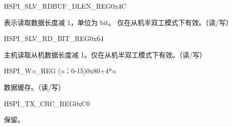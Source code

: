 \begin{register}{H}{SPI\_SLV\_RDBUF\_DLEN\_REG}{0x4C}\label{regdesc:SPISLVRDBUFDLENREG}
%
%
\regnewline%
\begin{regdesc}\begin{reglist}
\item [SPI\_SLV\_RDBUF\_DBITLEN]表示读取数据长度减 1，单位为 bit。 仅在从机半双工模式下有效。（读/写）
\end{reglist}\end{regdesc}
\end{register}


\begin{register}{H}{SPI\_SLV\_RD\_BIT\_REG}{0x64}\label{regdesc:SPISLVRDBITREG}
%
%
\regnewline%
\begin{regdesc}\begin{reglist}
\item [SPI\_SLV\_RDATA\_BIT] 主机读取从机数据长度减 1。仅在从机半双工模式下有效。（读/写）
\end{reglist}\end{regdesc}
\end{register}


\begin{register}{H}{SPI\_W\textcolor{red}{\it{n}}\_REG (\textcolor{red}{\it{n}}：0-15)}{0x80+4*\textcolor{red}{\it{n}}}\label{regdesc:SPIWnREG}
%
\regnewline%
\begin{regdesc}\begin{reglist}
\item [SPI\_W\textcolor{red}{\it{n}}\_REG]数据缓存。（读/写）
\end{reglist}\end{regdesc}
\end{register}


\begin{register}{H}{SPI\_TX\_CRC\_REG}{0xC0}\label{regdesc:SPITXCRCREG}
%
\regnewline%
\begin{regdesc}\begin{reglist}
\item [SPI\_TX\_CRC\_REG] 保留。
\end{reglist}\end{regdesc}
\end{register}


